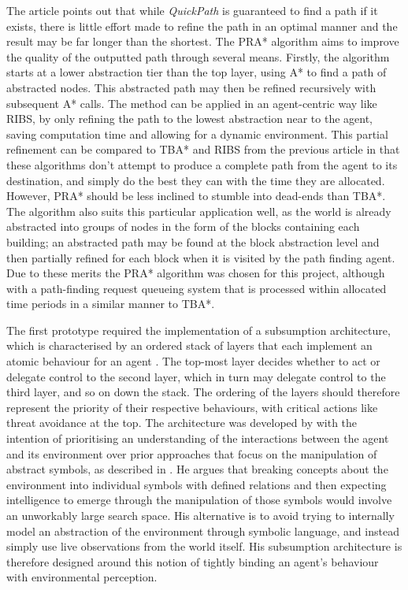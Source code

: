 \documentclass[a4paper,12pt]{article}
\begin{document}
The article points out that while \emph{QuickPath} is guaranteed to find a path if it exists, there is little effort made to refine the path in an optimal manner and the result may be far longer than the shortest. The PRA* algorithm aims to improve the quality of the outputted path through several means. Firstly, the algorithm starts at a lower abstraction tier than the top layer, using A* to find a path of abstracted nodes. This abstracted path may then be refined recursively with subsequent A* calls. The method can be applied in an agent-centric way like RIBS, by only refining the path to the lowest abstraction near to the agent, saving computation time and allowing for a dynamic environment. This partial refinement can be compared to TBA* and RIBS from the previous article in that these algorithms don't attempt to produce a complete path from the agent to its destination, and simply do the best they can with the time they are allocated. However, PRA* should be less inclined to stumble into dead-ends than TBA*. The algorithm also suits this particular application well, as the world is already abstracted into groups of nodes in the form of the blocks containing each building; an abstracted path may be found at the block abstraction level and then partially refined for each block when it is visited by the path finding agent. Due to these merits the PRA* algorithm was chosen for this project, although with a path-finding request queueing system that is processed within allocated time periods in a similar manner to TBA*.

The first prototype required the implementation of a subsumption architecture, which is characterised by an ordered stack of layers that each implement an atomic behaviour for an agent \cite{brooks90}. The top-most layer decides whether to act or delegate control to the second layer, which in turn may delegate control to the third layer, and so on down the stack. The ordering of the layers should therefore represent the priority of their respective behaviours, with critical actions like threat avoidance at the top. The architecture was developed by  with the intention of prioritising an understanding of the interactions between the agent and its environment over prior approaches that focus on the manipulation of abstract symbols, as described in . He argues that breaking concepts about the environment into individual symbols with defined relations and then expecting intelligence to emerge through the manipulation of those symbols would involve an unworkably large search space. His alternative is to avoid trying to internally model an abstraction of the environment through symbolic language, and instead simply use live observations from the world itself. His subsumption architecture is therefore designed around this notion of tightly binding an agent's behaviour with environmental perception.
\end{document}

